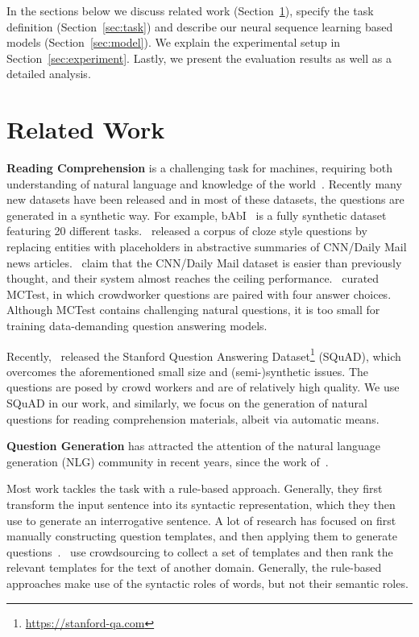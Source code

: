 \documentclass[11pt,a4paper]{article}
\begin{document}
In the sections below we discuss related work (Section~\ref{sec:related}), specify the task definition (Section~\ref{sec:task}) and describe our neural sequence learning based models (Section~\ref{sec:model}). We explain the experimental setup in Section~\ref{sec:experiment}. Lastly, we present the evaluation results as well as a detailed analysis.

\section{Related Work}
\label{sec:related}

\textbf{Reading Comprehension} is a challenging task for machines, requiring both understanding of natural language and knowledge of the world~\cite{rajpurkar2016squad}. Recently many new datasets have been released and in most of these datasets, the questions are generated in a synthetic way. For example, bAbI~\cite{weston2015towards} is a fully synthetic dataset featuring 20 different tasks.~ released a corpus of cloze style questions by replacing entities with placeholders in abstractive summaries of CNN/Daily Mail news articles.~ claim that the CNN/Daily Mail dataset is easier than previously thought, and their system almost reaches the ceiling performance.~ curated MCTest, in which crowdworker questions are paired with four answer choices. Although MCTest contains challenging natural questions, it is too small for training data-demanding question answering models.

Recently,~ released the Stanford Question Answering Dataset\footnote{\url{https://stanford-qa.com}} (SQuAD), which overcomes the aforementioned small size and (semi-)synthetic issues. The questions are posed by crowd workers and are of relatively high quality. We use SQuAD in our work, and similarly, we focus on the generation of natural questions for reading comprehension materials, albeit via automatic means.

\textbf{Question Generation} has attracted the attention of the natural language generation (NLG) community in recent years, since the work of~.

Most work tackles the task with a rule-based approach. Generally, they first transform the input sentence into its syntactic representation, which they then use to generate an interrogative sentence. A lot of research has focused on first manually constructing question templates, and then applying them to generate questions~\cite{mostow2009generating, lindberg2013online, mazidi2014linguistic}.~ use crowdsourcing to collect a set of templates and then rank the relevant templates for the text of another domain. Generally, the rule-based approaches make use of the syntactic roles of words, but not their semantic roles. 
\end{document}
